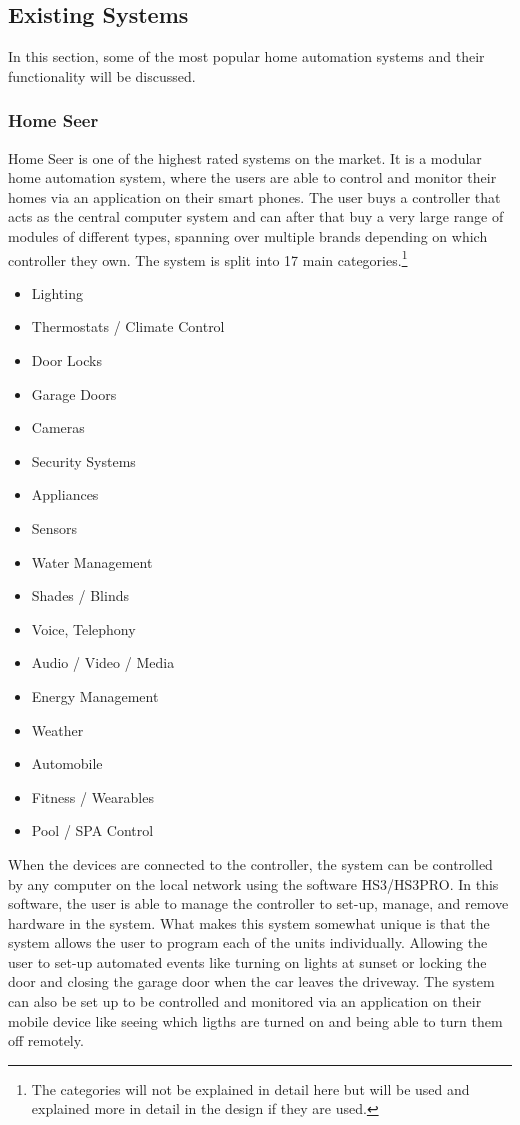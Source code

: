 \subsection{Existing Systems}
In this section, some of the most popular home automation systems and their functionality will be discussed.

\subsubsection{Home Seer}
Home Seer is one of the highest rated systems on the market. It is a modular home automation system, where the users are able to control and monitor their homes via an application on their smart phones. The user buys a controller that acts as the central computer system and can after that buy a very large range of modules of different types, spanning over multiple brands depending on which controller they own. The system is split into 17 main categories.\footnote{The categories will not be explained in detail here but will be used and explained more in detail in the design if they are used.}
\begin{itemize}
	\item Lighting
	\item Thermostats / Climate Control
	\item Door Locks
	\item Garage Doors
	\item Cameras
	\item Security Systems
	\item Appliances
	\item Sensors
	\item Water Management
	\item Shades / Blinds
	\item Voice, Telephony
	\item Audio / Video / Media
	\item Energy Management
	\item Weather
	\item Automobile
	\item Fitness / Wearables
	\item Pool / SPA Control
\end{itemize}%
When the devices are connected to the controller, the system can be controlled by any computer on the local network using the software HS3/HS3PRO. In this software, the user is able to manage the controller to set-up, manage, and remove hardware in the system. What makes this system somewhat unique is that the system allows the user to program each of the units individually. Allowing the user to set-up automated events like turning on lights at sunset or locking the door and closing the garage door when the car leaves the driveway. The system can also be set up to be controlled and monitored via an application on their mobile device like seeing which ligths are turned on and being able to turn them off remotely.%

